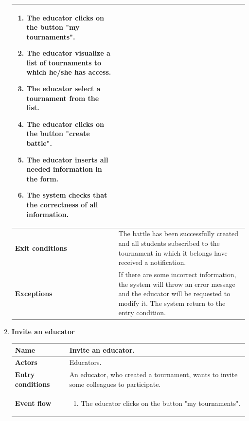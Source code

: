 \begin{enumerate}[label=\textbf{UC.\arabic*}]
\begin{table}[H]
\begin{tabular}{|m{3.2cm}|m{9.8cm}|}
\begin{enumerate}[label=\arabic*.]
                        \item The educator clicks on the button "my tournaments".
                        \item The educator visualize a list of tournaments to which he/she has access.
                        \item The educator select a tournament from the list.
                        \item The educator clicks on the button "create battle".
                        \item The educator inserts all needed information in the form.
                        \item The system checks that the correctness of all information.
                    \end{enumerate}\\
                    \hline
                    \textbf{Exit conditions}  & The battle has been successfully created and all students subscribed to the tournament in which it belongs have received a notification.  \\
                    \hline
                    \textbf{Exceptions}  &  If there are some incorrect information, the system will throw an error message and the educator will be requested to modify it.  The system return to the entry condition. \\
                    \hline 
                \end{tabular}
        \end{table}
        \item {} \textbf{Invite an educator}
        \begin{table}[H]
    	    \centering
                \renewcommand{\arraystretch}{1.5}
                \begin{tabular}{|m{3.2cm}|m{9.8cm}|}
                    \hline
                    \textbf{Name} & Invite an educator. \\
                    \hline
                    \textbf{Actors} & Educators. \\
                    \hline
                    \textbf{Entry conditions}  & An educator, who created a tournament, wants to invite some colleagues to participate. \\
                    \hline
                    \textbf{Event flow}  & 
                    \begin{enumerate}[label=\arabic*.]
                        \item The educator clicks on the button "my tournaments".

\end{enumerate}
\end{tabular}
\end{table}
\end{enumerate}
